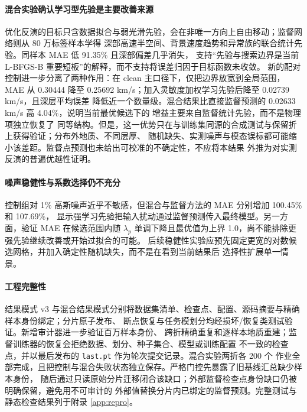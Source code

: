 \documentclass[UTF8,a4paper,11pt]{ctexart}
\begin{document}
\paragraph{混合实验确认学习型先验是主要改善来源}
优化反演的目标只含数据拟合与弱光滑先验，会在非唯一方向上自由移动；监督网络则从 80 万标签样本学得
深部高速半空间、背景速度趋势和异常族的联合统计先验。同样本 MAE 低 91.35\% 且深部偏差几乎消失，
支持“先验与搜索边界是当前 L-BFGS-B 重要短板”的解释，而不支持将误差归因于目标函数未收敛。
新的配对控制进一步分离了两种作用：在 clean 主口径下，仅把边界放宽到全局范围，MAE 从
0.30444 降至 0.25692 km/s；加入灵敏度加权学习先验后降至 0.02739 km/s，且深层平均误差
降低近一个数量级。混合结果比直接监督预测的 0.02633 km/s 高 4.04\%，说明当前最优候选下的
增益主要来自监督统计先验，而不是物理项独立恢复了
同等结构。但是，这一优势只在与训练集同源的合成测试与保留折上获得验证；分布外地质、不同层厚、
随机缺失、实测噪声与模态误标都可能缩小该差距。监督点预测也未给出可校准的不确定性，不应将本结果
外推为对实测反演的普遍优越性证明。

\paragraph{噪声稳健性与系数选择仍不充分}
控制组对 1\% 高斯噪声近乎不敏感，但混合与监督方法的 MAE 分别增加 100.45\% 和 107.69\%，
显示强学习先验把输入扰动通过监督预测传入最终模型。另一方面，验证 MAE 在候选范围内随
\(\lambda_p\) 单调下降且最优值为上界 1.0，尚不能排除更强先验继续改善或开始过拟合的可能。
后续稳健性实验应预先固定更宽的对数候选网格，并加入确定性随机缺失，而不是在看到当前结果后
选择性扩展单一情景。

\paragraph{工程完整性}
结果模式 v3 与混合结果模式分别将数据集清单、检查点、配置、源码摘要与精确样本身份绑定；分片原子发布、
断点恢复与任务模划分均经损坏/恢复类测试验证。新增审计器进一步验证百万样本身份、
跨折精确重复和逐样本地质重建；监督训练器的恢复会拒绝数据、划分、种子集合、模型或训练配置
不一致的检查点，并以最后发布的 \texttt{last.pt} 作为轮次提交记录。混合实验两折各 200 个
作业全部完成，且把控制与混合失败状态独立保存。严格门控先暴露了旧基线汇总缺少样本身份，
随后通过只读原始分片迁移闭合该缺口；外部监督检查点身份缺口仍被明确保留，避免用不可审计的
外部值替换分片内已绑定的监督预测。完整测试与静态检查结果列于附录
\ref{app:repro}。
\end{document}

